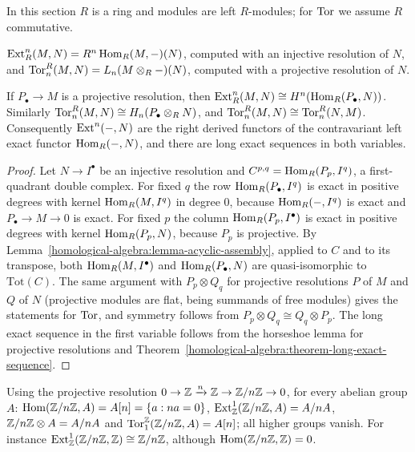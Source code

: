 In this section $R$ is a ring and modules are left $R$-modules; for $\operatorname{Tor}$ we assume $R$ commutative.

\begin{definition}\label{homological-algebra:definition-ext-tor}
$\operatorname{Ext}^n_R(M, N) = R^n\operatorname{Hom}_R(M, -)(N)$, computed with an injective resolution of $N$, and
$\operatorname{Tor}_n^R(M, N) = L_n(M \otimes_R -)(N)$, computed with a projective resolution of $N$.
\end{definition}

\begin{theorem}[Balance]\label{homological-algebra:theorem-balance}
If $P_\bullet \to M$ is a projective resolution, then $\operatorname{Ext}^n_R(M, N) \cong H^n(\operatorname{Hom}_R(P_\bullet, N))$. Similarly
$\operatorname{Tor}_n^R(M, N) \cong H_n(P_\bullet \otimes_R N)$, and $\operatorname{Tor}_n^R(M, N) \cong \operatorname{Tor}_n^R(N, M)$. Consequently $\operatorname{Ext}^n(-, N)$ are the right
derived functors of the contravariant left exact functor $\operatorname{Hom}_R(-, N)$, and there are long exact sequences in both
variables.
\end{theorem}

\begin{proof}
Let $N \to I^\bullet$ be an injective resolution and $C^{p,q} = \operatorname{Hom}_R(P_p, I^q)$, a first-quadrant double complex. For fixed $q$ the
row $\operatorname{Hom}_R(P_\bullet, I^q)$ is exact in positive degrees with kernel $\operatorname{Hom}_R(M, I^q)$ in degree $0$, because $\operatorname{Hom}_R(-, I^q)$ is
exact and $P_\bullet \to M \to 0$ is exact. For fixed $p$ the column $\operatorname{Hom}_R(P_p, I^\bullet)$ is exact in positive degrees with kernel
$\operatorname{Hom}_R(P_p, N)$, because $P_p$ is projective. By Lemma~\ref{homological-algebra:lemma-acyclic-assembly}, applied to $C$ and to its
transpose, both $\operatorname{Hom}_R(M, I^\bullet)$ and $\operatorname{Hom}_R(P_\bullet, N)$ are quasi-isomorphic to $\mathrm{Tot}(C)$. The same argument with
$P_p \otimes Q_q$ for projective resolutions $P$ of $M$ and $Q$ of $N$ (projective modules are flat, being summands of free
modules) gives the statements for $\operatorname{Tor}$, and symmetry follows from $P_p \otimes Q_q \cong Q_q \otimes P_p$. The long exact sequence
in the first variable follows from the horseshoe lemma for projective resolutions and
Theorem~\ref{homological-algebra:theorem-long-exact-sequence}.
\end{proof}

\begin{example}\label{homological-algebra:example-ext-tor-cyclic}
Using the projective resolution $0 \to \mathbb{Z} \xrightarrow{n} \mathbb{Z} \to \mathbb{Z}/n\mathbb{Z} \to 0$, for every abelian group $A$:
$\operatorname{Hom}(\mathbb{Z}/n\mathbb{Z}, A) = A[n] = \{a : na = 0\}$, $\operatorname{Ext}^1_{\mathbb{Z}}(\mathbb{Z}/n\mathbb{Z}, A) = A/nA$, $\mathbb{Z}/n\mathbb{Z} \otimes A = A/nA$ and
$\operatorname{Tor}_1^{\mathbb{Z}}(\mathbb{Z}/n\mathbb{Z}, A) = A[n]$; all higher groups vanish. For instance $\operatorname{Ext}^1_{\mathbb{Z}}(\mathbb{Z}/n\mathbb{Z}, \mathbb{Z}) \cong \mathbb{Z}/n\mathbb{Z}$, although
$\operatorname{Hom}(\mathbb{Z}/n\mathbb{Z}, \mathbb{Z}) = 0$.
\end{example}

